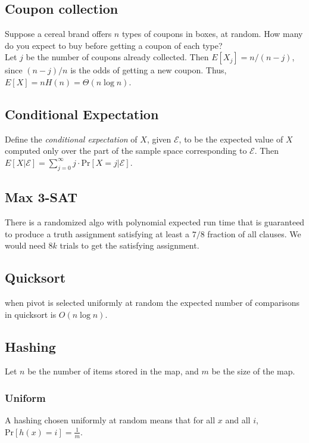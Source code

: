 \subsection{Coupon collection}
Suppose a cereal brand offers $n$ types of coupons in boxes, at random. How many do you expect to buy before getting a coupon of each type?\\

Let $j$ be the number of coupons already collected. Then $E[ X_{j}] = n / (n - j)$, since $( n - j ) / n$ is the odds of getting a new coupon. Thus, $E[X] = nH(n) = \Theta(n \log n)$.

\subsection{Conditional Expectation}
Define the \emph{conditional expectation} of $X$, given $\mathscr{E}$, to be the expected value of $X$ computed only over the part of the sample space corresponding to $\mathscr{E}$. Then $E[ X | \mathscr{E} ] =  \sum_{j=0}^{\infty} j \cdot \text{Pr} [ X = j | \mathscr{E} ]$.

\subsection{Max 3-SAT}
There is a randomized algo with polynomial expected run time that is guaranteed to produce a truth assignment satisfying at least a $7/8$ fraction of all clauses. We would need $8k$ trials to get the satisfying assignment.

\subsection{Quicksort}

when pivot is selected uniformly at random the expected number of comparisons in quicksort is $O(n \log n)$.


\subsection{Hashing}
Let $n$ be the number of items stored in the map, and $m$ be the size of the map.

\subsubsection{Uniform}
A hashing chosen uniformly at random means that for all $x$ and all $i$, $\text{Pr}[h(x) = i] = \frac{1}{m}$.

